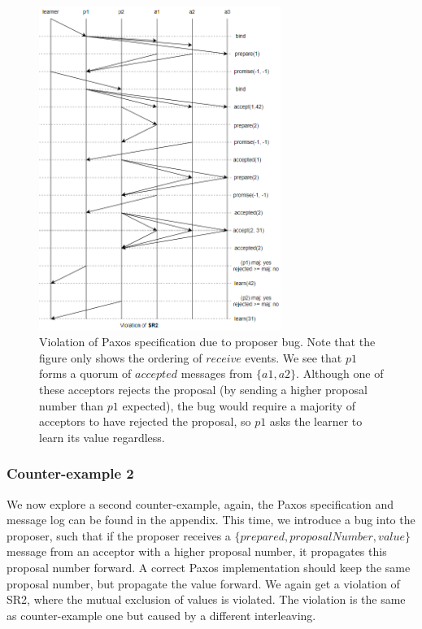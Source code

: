 \begin{figure}[h]
    \centering
    \includegraphics[width=0.7\textwidth]{images/Paxos_2.png}
    \caption{Violation of Paxos specification due to proposer bug. Note that the figure only shows the ordering of $receive$ events. We see that $p1$ forms a quorum of $accepted$ messages from $\{a1, a2\}$. Although one of these acceptors rejects the proposal (by sending a higher proposal number than $p1$ expected), the bug would require a majority of acceptors to have rejected the proposal, so $p1$ asks the learner to learn its value regardless.}
    \label{fig:Paxos_1}
\end{figure}
\subsubsection{Counter-example 2}
We now explore a second counter-example, again, the Paxos specification and message log can be found in the appendix. This time, we introduce a bug into the proposer, such that if the proposer receives a $\{prepared, proposalNumber, value\}$ message from an acceptor with a higher proposal number, it propagates this proposal number forward. A correct Paxos implementation should keep the same proposal number, but propagate the value forward. We again get a violation of SR2, where the mutual exclusion of values is violated. The violation is the same as counter-example one but caused by a different interleaving. 
\\ \\
